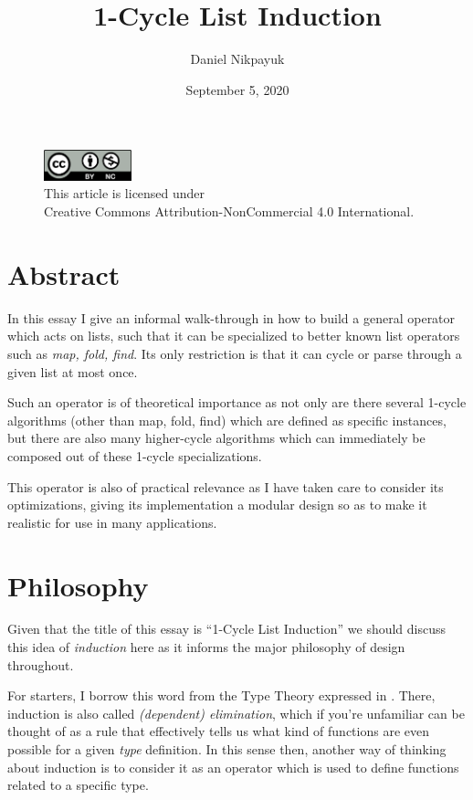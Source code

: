 \documentclass[twoside]{article}
\title{1-Cycle List Induction}
\author{Daniel Nikpayuk}
\date{September 5, 2020}
\begin{document}
\maketitle
\thispagestyle{empty}

\begin{figure}[h]
\centering
\includegraphics[width=1in]{../../../../cc-by-nc.png}\\[0.1in]
\tiny This article is licensed under \\
Creative Commons Attribution-NonCommercial 4.0 International.\\[0.3in]
\end{figure}

\section*{Abstract}

In this essay I give an informal walk-through in how to build a general operator which acts on lists, such that it can
be specialized to better known list operators such as \emph{map, fold, find}. Its only restriction is that it can cycle
or parse through a given list at most once.

Such an operator is of theoretical importance as not only are there several 1-cycle algorithms (other than map, fold, find)
which are defined as specific instances, but there are also many higher-cycle algorithms which can immediately be composed
out of these 1-cycle specializations.

This operator is also of practical relevance as I have taken care to consider its optimizations, giving its implementation
a modular design so as to make it realistic for use in many applications.

\section*{Philosophy}

Given that the title of this essay is ``1-Cycle List Induction'' we should discuss this idea of \emph{induction}
here as it informs the major philosophy of design throughout.

For starters, I borrow this word from the Type Theory expressed in \cite{hott}. There, induction is also called
\emph{(dependent) elimination}, which if you're unfamiliar can be thought of as a rule that effectively tells us what
kind of functions are even possible for a given \emph{type} definition. In this sense then, another way of thinking
about induction is to consider it as an operator which is used to define functions related to a specific type.
\end{document}
